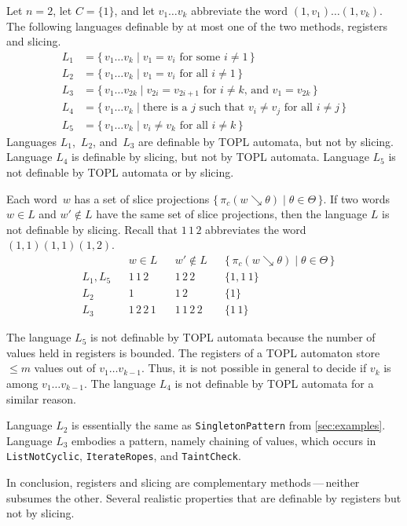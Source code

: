 \documentclass{article} %
\theoremstyle{definition}
\theoremstyle{remark}
\begin{document}
Let $n=2$, let $C=\{1\}$, and let $v_1\ldots v_k$ abbreviate the word $(1,v_1)\ldots(1,v_k)$.
The following languages definable by at most one of the two methods, registers and slicing.
\begin{align*}
L_1 &= \{\, v_1\ldots v_k\mid\text{$v_1=v_i$ for some $i\ne1$}\,\} \\
L_2 &= \{\, v_1\ldots v_k\mid\text{$v_1=v_i$ for all $i\ne1$}\,\} \\
L_3 &= \{\, v_1\ldots v_{2k}\mid\text{$v_{2i}=v_{2i+1}$ for $i\ne k$, and $v_1=v_{2k}$}\,\} \\
L_4 &= \{\, v_1\ldots v_k\mid\text{there is a $j$ such that $v_i\ne v_j$ for all $i\ne j$}\,\} \\
L_5 &= \{\, v_1\ldots v_k\mid\text{$v_i\ne v_k$ for all $i\ne k$}\,\}
\end{align*}
Languages $L_1$,~$L_2$, and~$L_3$ are definable by TOPL automata, but not by slicing.
Language $L_4$ is definable by slicing, but not by TOPL automata.
Language $L_5$ is not definable by TOPL automata or by slicing.

Each word~$w$ has a set of slice projections $\{\,\pi_c(w\searrow\theta)\mid\theta\in\Theta\,\}$.
If two words $w\in L$ and $w'\notin L$ have the same set of slice projections, then the language $L$ is not definable by slicing.
Recall that $1\,1\,2$ abbreviates the word $(1,1)(1,1)(1,2)$.
\begin{align*}
  && &w \in L &&w'\notin L && \{\,\pi_c(w\searrow\theta)\mid\theta\in\Theta\,\}\\
&L_1, L_5 &&1\,1\,2 &&1\,2\,2 &&\{1, 1\,1\} \\
&L_2 &&1 &&1\,2 && \{1\}\\
&L_3 &&1\,2\,2\,1 &&1\,1\,2\,2 &&\{1\,1\}
\end{align*}

The language $L_5$ is not definable by TOPL automata because the number of values held in registers is bounded.
The registers of a TOPL automaton store $\le m$ values out of $v_1\ldots v_{k-1}$.
Thus, it is not possible in general to decide if $v_k$ is among $v_1\ldots v_{k-1}$.
The language $L_4$ is not definable by TOPL automata for a similar reason.


Language $L_2$ is essentially the same as {\tt SingletonPattern} from \autoref{sec:examples}.
Language $L_3$ embodies a pattern, namely chaining of values, which occurs in {\tt ListNotCyclic}, {\tt IterateRopes}, and {\tt TaintCheck}.

In conclusion, registers and slicing are complementary methods\,---\,neither subsumes the other.
Several realistic properties that are definable by registers but not by slicing.
\end{document}
